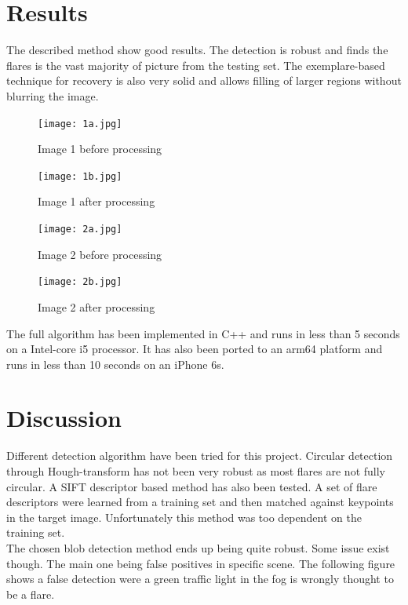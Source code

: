 \documentclass[11pt,twocolumn]{article}
\begin{document}
\section{Results}

The described method show good results. The detection is robust and finds the flares is the vast majority of picture from the testing set. The exemplare-based technique for recovery is also very solid and allows filling of larger regions without blurring the image.

\begin{figure}[ht!]
\centering
\texttt{[image: 1a.jpg]}
\caption{Image 1 before processing}
\end{figure}

\begin{figure}[ht!]
\centering
\texttt{[image: 1b.jpg]}
\caption{Image 1 after processing}
\end{figure}

\begin{figure}[ht!]
\centering
\texttt{[image: 2a.jpg]}
\caption{Image 2 before processing}
\end{figure}

\begin{figure}[ht!]
\centering
\texttt{[image: 2b.jpg]}
\caption{Image 2 after processing}
\end{figure}

The full algorithm has been implemented in C++ and runs in less than 5 seconds on a Intel-core i5 processor.
It has also been ported to an arm64 platform and runs in less than 10 seconds on an iPhone 6s.

\section{Discussion}

Different detection algorithm have been tried for this project.
Circular detection through Hough-transform has not been very robust as most flares are not fully circular.
A SIFT descriptor based method has also been tested. A set of flare descriptors were learned from a training set and then matched against keypoints in the target image. Unfortunately this method was too dependent on the training set.
\\

The chosen blob detection method ends up being quite robust. Some issue exist though. The main one being false positives in specific scene. The following figure shows a false detection were a green traffic light in the fog is wrongly thought to be a flare.
\\
\end{document}
